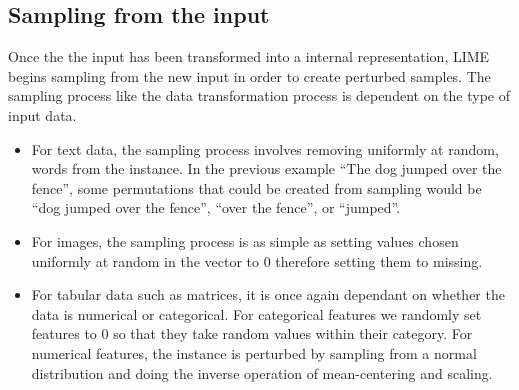 \subsection{Sampling from the input} \label{sect:sampling-lime} Once the the input has been transformed into a internal representation, LIME begins sampling from the new input in order to create perturbed samples. The sampling process like the data transformation process is dependent on the type of input data.

\begin{itemize}
\item For text data, the sampling process involves removing uniformly at random, words from the instance. In the previous example ``The dog jumped over the fence'', some permutations that could be created from sampling would be ``dog jumped over the fence'', ``over the fence'', or ``jumped''.

\item For images, the sampling process is as simple as setting  values chosen uniformly at random in the vector to 0 therefore setting them to missing.

\item For tabular data such as matrices, it is once again dependant on whether the data is numerical or categorical. For categorical features we randomly set features to 0 so that they take random values within their category. For numerical features, the instance is perturbed by sampling from a normal distribution and doing the inverse operation of mean-centering and scaling.
\end{itemize}



